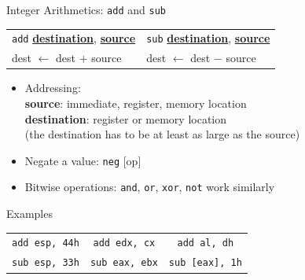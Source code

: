 \documentclass[]{beamer}
\begin{document}
\begin{frame}{Integer Arithmetics: {\tt add} and {\tt sub}}
\begin{table}
	\centering
\begin{tabular}{l|l}
{\tt add} \underline{\textbf{destination}}, \underline{\textbf{source}} & {\tt sub} \underline{\textbf{destination}}, \underline{\textbf{source}} \\
dest $\leftarrow$ dest $+$ source & dest $\leftarrow$ dest $-$ source \\
\end{tabular}
\end{table}
  
  \begin{itemize}
  \item Addressing: \\
    \textbf{source}: immediate, register, memory location\\
    \textbf{destination}: register or memory location\\
    (the destination has to be at least as large as the source)
  \item Negate a value: {\tt neg} [op]
  \item Bitwise operations: {\tt and}, {\tt or}, {\tt xor}, {\tt not} work similarly
   \end{itemize}

  \begin{block}{Examples}
  	\centering
      \begin{tabular}{c|c|c}
        {\tt add esp, 44h} & {\tt add edx, cx} & {\tt add al, dh} \\[.4em]
        {\tt sub esp, 33h} & {\tt sub eax, ebx} & {\tt sub [eax], 1h} \\
      \end{tabular}
  \end{block}
\end{frame}
\end{document}
